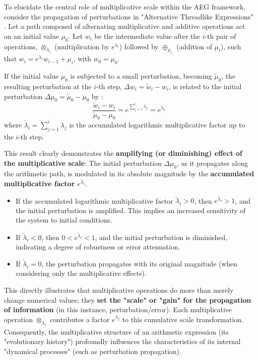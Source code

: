 \documentclass{article}
\begin{document}
To elucidate the central role of multiplicative scale within the AEG framework, consider the propagation of perturbations in "Alternative Threadlike Expressions" \cite[Sec 2.6]{YuanAEG}. Let a path composed of alternating multiplicative and additive operations act on an initial value $\mu_0$. Let $w_i$ be the intermediate value after the $i$-th pair of operations, $\otimes_{\lambda_i}$ (multiplication by $e^{\lambda_i}$) followed by $\oplus_{\mu_i}$ (addition of $\mu_i$), such that $w_i = e^{\lambda_i} w_{i-1} + \mu_i$, with $w_0 = \mu_0$.

If the initial value $\mu_0$ is subjected to a small perturbation, becoming $\tilde{\mu}_0$, the resulting perturbation at the $i$-th step, $\Delta w_i = \tilde{w}_i - w_i$, is related to the initial perturbation $\Delta \mu_0 = \tilde{\mu}_0 - \mu_0$ by \cite[Sec 2.6, Eq. 25]{YuanAEG}:
$$\frac{\tilde{w}_i - w_i}{\tilde{\mu}_0 - \mu_0} = e^{\sum_{j=1}^i \lambda_j} = e^{\check{\lambda}_i}$$
where $\check{\lambda}_i = \sum_{j=1}^i \lambda_j$ is the accumulated logarithmic multiplicative factor up to the $i$-th step.

This result clearly demonstrates the \textbf{amplifying (or diminishing) effect of the multiplicative scale}:
The initial perturbation $\Delta \mu_0$, as it propagates along the arithmetic path, is modulated in its absolute magnitude by the \textbf{accumulated multiplicative factor $e^{\check{\lambda}_i}$}.

\begin{itemize}
    \item If the accumulated logarithmic multiplicative factor $\check{\lambda}_i > 0$, then $e^{\check{\lambda}_i} > 1$, and the initial perturbation is amplified. This implies an increased sensitivity of the system to initial conditions.
    \item If $\check{\lambda}_i < 0$, then $0 < e^{\check{\lambda}_i} < 1$, and the initial perturbation is diminished, indicating a degree of robustness or error attenuation.
    \item If $\check{\lambda}_i = 0$, the perturbation propagates with its original magnitude (when considering only the multiplicative effects).
\end{itemize}
This directly illustrates that multiplicative operations do more than merely change numerical values; they \textbf{set the "scale" or "gain" for the propagation of information} (in this instance, perturbation/error). Each multiplicative operation $\otimes_{\lambda_j}$ contributes a factor $e^{\lambda_j}$ to this cumulative scale transformation. Consequently, the multiplicative structure of an arithmetic expression (its "evolutionary history") profoundly influences the characteristics of its internal "dynamical processes" (such as perturbation propagation).
\end{document}
